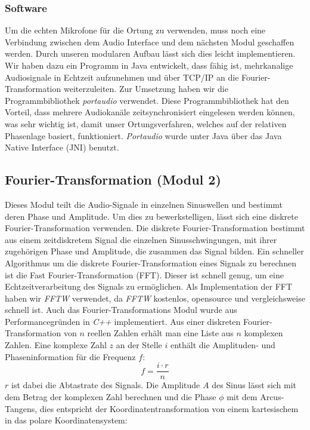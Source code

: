 \subsubsection{Software}
Um die echten Mikrofone für die Ortung zu verwenden, muss noch eine Verbindung zwischen dem Audio Interface und dem nächsten Modul geschaffen werden. Durch unseren modularen Aufbau lässt sich dies leicht implementieren. Wir haben dazu ein Programm in Java entwickelt, dass fähig ist, mehrkanalige Audiosignale in Echtzeit aufzunehmen und über TCP/IP an die Fourier-Transformation weiterzuleiten. Zur Umsetzung haben wir die Programmbibliothek \textit{portaudio} \cite{portaudio} verwendet. Diese Programmbibliothek hat den Vorteil, dass mehrere Audiokanäle zeitsynchronisiert eingelesen werden können, was sehr wichtig ist, damit unser Ortungsverfahren, welches auf der relativen Phasenlage basiert, funktioniert. \textit{Portaudio} wurde unter Java über das Java Native Interface (JNI) benutzt.

\subsection{Fourier-Transformation (Modul 2)}
Dieses Modul teilt die Audio-Signale in einzelnen Sinuswellen und bestimmt deren Phase und Amplitude. Um dies zu bewerkstelligen, lässt sich eine diskrete Fourier-Transformation verwenden. Die diskrete Fourier-Transformation bestimmt aus einem zeitdiskretem Signal die einzelnen Sinusschwingungen, mit ihrer zugehörigen Phase und Amplitude, die zusammen das Signal bilden. Ein schneller Algorithmus um die diskrete Fourier-Transformation eines Signals zu berechnen ist die Fast Fourier-Transformation (FFT). Dieser ist schnell genug, um eine Echtzeitverarbeitung des Signals zu ermöglichen. Als Implementation der FFT haben wir \textit{FFTW}\cite{FFTW} verwendet, da \textit{FFTW} kostenlos, opensource und vergleichsweise schnell ist.
Auch das Fourier-Transformations Modul wurde aus Performancegründen in \textit{C++} implementiert.
Aus einer diskreten Fourier-Transformation von $n$ reellen Zahlen erhält man eine Liste aus $n$ komplexen Zahlen. Eine komplexe Zahl $z$ an der Stelle $i$ enthält die Amplituden- und Phaseninformation für die Frequenz $f$:
$$
f = \frac{i\cdot r}{n}
$$
$r$ ist dabei die Abtastrate des Signals. Die Amplitude $A$ des Sinus lässt sich mit dem Betrag der komplexen Zahl berechnen und die Phase $\phi$ mit dem Arcus-Tangens, dies entspricht der Koordinatentransformation von einem kartesischem in das polare Koordinatensystem:

